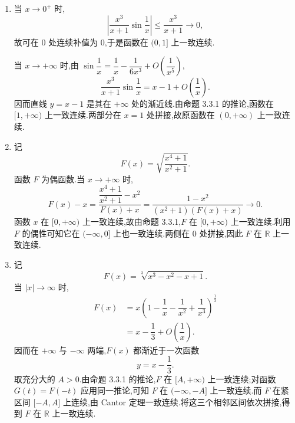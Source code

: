 \begin{solution}
    \leavevmode
    \begin{enumerate}
        \item 当 $x\to0^+$ 时,
              \[
                  \left|\dfrac{x^3}{x+1}\sin\dfrac{1}{x}\right|
                  \leq\dfrac{x^3}{x+1}\longrightarrow0,
              \]
              故可在 $0$ 处连续补值为 $0$,于是函数在 $(0,1\rbrack$ 上一致连续.

              当 $x\to+\infty$ 时,由 $\displaystyle\sin\dfrac{1}{x}=\dfrac{1}{x}-\dfrac{1}{6x^3}+O\left(\dfrac{1}{x^5}\right)$,
              \[
                  \dfrac{x^3}{x+1}\sin\dfrac{1}{x}
                  =x-1+O\left(\dfrac{1}{x}\right).
              \]
              因而直线 $y=x-1$ 是其在 $+\infty$ 处的渐近线.由命题 3.3.1 的推论,函数在 $\lbrack1,+\infty)$ 上一致连续.两部分在 $x=1$ 处拼接,故原函数在 $(0,+\infty)$ 上一致连续.

        \item 记
              \[
                  F(x)=\sqrt{\dfrac{x^4+1}{x^2+1}}.
              \]
              函数 $F$ 为偶函数.当 $x\to+\infty$ 时,
              \[
                  F(x)-x
                  =\dfrac{\dfrac{x^4+1}{x^2+1}-x^2}{F(x)+x}
                  =\dfrac{1-x^2}{(x^2+1)(F(x)+x)}
                  \longrightarrow0.
              \]
              函数 $x$ 在 $\lbrack0,+\infty)$ 上一致连续,故由命题 3.3.1,$F$ 在 $\lbrack0,+\infty)$ 上一致连续.利用 $F$ 的偶性可知它在 $(-\infty,0\rbrack$ 上也一致连续.两侧在 $0$ 处拼接,因此 $F$ 在 $\mathbb{R}$ 上一致连续.

        \item 记
              \[
                  F(x)=\sqrt[3]{x^3-x^2-x+1}.
              \]
              当 $|x|\to\infty$ 时,
              \[
                  \begin{aligned}
                      F(x)
                      &=x\left(1-\dfrac{1}{x}-\dfrac{1}{x^2}+\dfrac{1}{x^3}\right)^{\frac{1}{3}}\\
                      &=x-\dfrac{1}{3}+O\left(\dfrac{1}{x}\right).
                  \end{aligned}
              \]
              因而在 $+\infty$ 与 $-\infty$ 两端,$F(x)$ 都渐近于一次函数
              \[
                  y=x-\dfrac{1}{3}.
              \]
              取充分大的 $A>0$.由命题 3.3.1 的推论,$F$ 在 $\lbrack A,+\infty)$ 上一致连续;对函数 $G(t)=F(-t)$ 应用同一推论,可知 $F$ 在 $(-\infty,-A\rbrack$ 上一致连续.而 $F$ 在紧区间 $\lbrack-A,A\rbrack$ 上连续,由 Cantor 定理一致连续.将这三个相邻区间依次拼接,得到 $F$ 在 $\mathbb{R}$ 上一致连续.
    \end{enumerate}
\end{solution}

